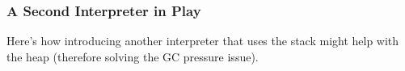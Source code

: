 \subsubsection{A Second Interpreter in Play}
\label{subsubsec:stackful}

Here's how introducing another interpreter that uses the stack might
help with the heap (therefore solving the GC pressure issue).
